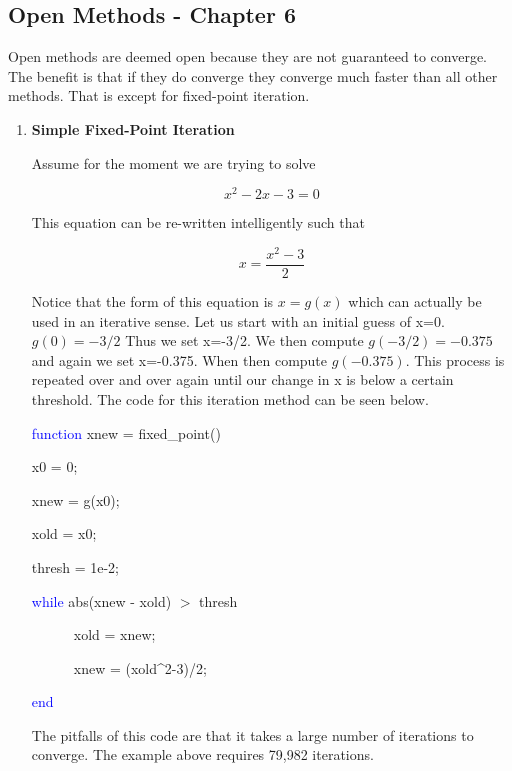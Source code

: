 \subsection{Open Methods - Chapter 6}

Open methods are deemed open because they are not guaranteed to
converge. The benefit is that if they do converge they converge much
faster than all other methods. That is except for fixed-point
iteration. 

\begin{enumerate}

\item {\bf Simple Fixed-Point Iteration}

Assume for the moment we are trying to solve

\begin{equation}
x^2 - 2x - 3 = 0
\end{equation}

This equation can be re-written intelligently such that

\begin{equation}
x = \frac{x^2-3}{2}
\end{equation}

Notice that the form of this equation is $x=g(x)$ which can actually
be used in an iterative sense. Let us start with an initial guess of
x=0. $g(0) = -3/2$ Thus we set x=-3/2. We then compute $g(-3/2) = -0.375$ and
again we set x=-0.375. When then compute $g(-0.375)$. This process is
repeated over and over again until our change in x is below a certain
threshold. The code for this iteration method can be seen below.

\begin{framed}
\textcolor{blue}{function} xnew = fixed\_point()

x0 = 0;

xnew = g(x0);

xold = x0;

thresh = 1e-2;

\textcolor{blue}{while} abs(xnew - xold) $>$ thresh

~~~~~~xold = xnew;

~~~~~~xnew = (xold\textrm{\^}2-3)/2;

\textcolor{blue}{end}

\end{framed}

The pitfalls of this code are that it takes a large number of
iterations to converge. The example above requires 79,982 iterations. 


\end{enumerate}
